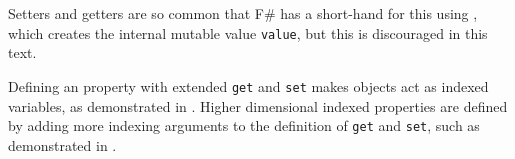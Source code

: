 \documentclass[fsharpNotes.tex]{subfiles}
\begin{document}
Setters and getters are so common that F\# has a short-hand for this using , which creates the internal mutable value \lstinline{value}, but this is discouraged in this text.

Defining an  property with extended \lstinline{get} and \lstinline{set} makes objects act as indexed variables, as demonstrated in .
%
% 
Higher dimensional indexed properties are defined by adding more indexing arguments to the definition of \lstinline{get} and \lstinline{set}, such as demonstrated in .
%
% 

\end{document}
